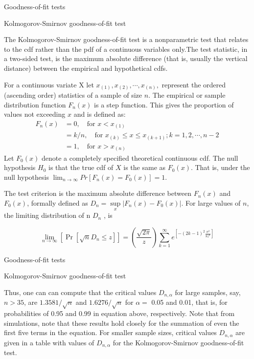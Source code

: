 \documentclass[8pt]{beamer}
\renewcommand{\emph}[1]{\textcolor{myorange}{#1}}
\begin{document}
\begin{frame}{Goodness-of-fit tests}
    \begin{block}{Kolmogorov-Smirnov goodness-of-fit test}
    \end{block}
    The \alert{Kolmogorov-Smirnov goodness-of-fit test} is a \emph{nonparametric test} that relates to the \emph{cdf} rather than the \emph{pdf} of a \emph{continuous variables} only.The \emph{test statistic}, in a \emph{two-sided test}, is the \emph{maximum absolute difference} (that is, usually the vertical distance) between the empirical and hypothetical \emph{cdfs}.

    For a continuous variate X let $x_{(1)}, x_{(2)}, \cdots, x_{(n)},$ represent the ordered (ascending order) statistics of a sample of size $n$. The empirical or sample distribution function $F_n (x)$ is a \emph{step function}. This gives the proportion of values not exceeding $x$ and is defined as:
    \begin{align*}
        F_n (x) &= 0, \quad \text{for } x < x_{(1)}\\
                &= k/n, \quad \text{for } x_{(k)} \leq x\leq x_{(k+1)}; k= 1, 2, \cdots, n-2 \\
                &= 1, \quad \text{for } x > x_{(n)}
    \end{align*}
    Let $F_0 (x)$ denote a completely specified theoretical continuous \emph{cdf}. The \emph{null hypothesis $H_0$ } is that the true \emph{cdf} of $X$ is the same as $F_0 (x)$. That is, under the null hypothesis $\lim_{n \rightarrow \infty} Pr[F_n (x) = F_0 (x)] = 1 $. 

    The  \emph{test criterion} is the maximum absolute difference between $F_n (x)$ and $F_0 (x)$, formally defined as $D_n = \underset{x}{\sup} | F_n (x) - F_0 (x) |$. For large values of $n$,  the limiting distribution of n $D_n$ , is

    \[
        \lim_{n\rightarrow \infty} \left[ \Pr [ \sqrt{n} D_n \leq z] \right]=\left( \frac{\sqrt{2\pi}}{z} \right) \sum_{k=1}^{\infty} e^{\left[-(2k-1)^2 \frac{\pi^2}{8z^2}\right]}
    \]

   \end{frame}

\begin{frame}{Goodness-of-fit tests}
    \begin{block}{Kolmogorov-Smirnov goodness-of-fit test}
    \end{block}

    Thus, one can can compute that the critical values $D_{n,\alpha}$ for large samples, say, $n > 35$, are $1.3581/\sqrt{n}$ and $1.6276/\sqrt{n}$ for $\alpha = $ 0.05 and 0.01, that is, for probabilities of 0.95 and 0.99 in equation above, respectively. Note that from simulations, note that these results hold closely for the summation of even the first five terms in the equation. For smaller sample sizes, critical values $D_{n,\alpha}$ are given in a table with values of $D_{n,\alpha}$ for the \emph{Kolmogorov-Smirnov goodness-of-fit test}.
        
   \end{frame}
\end{document}
